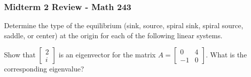 \documentclass[11pt]{exam}
\newcommand{\ds}{\displaystyle}
\begin{document}
\graphicspath{{/home/brian/Dropbox/HSC/Spring16/Math111/}}

\subsubsection*{Midterm 2 Review - Math 243}

\begin{questions}
\question Determine the type of the equilibrium (sink, source, spiral sink, spiral source, saddle, or center) at the origin for each of the following linear systems. 

\question Show that $\begin{bmatrix} 2 \\ i \end{bmatrix}$  is an eigenvector for the matrix $A = \begin{bmatrix} 0 & 4 \\ -1 & 0 \end{bmatrix}$. What is the corresponding eigenvalue? 
\vfill


\end{questions}
\end{document}
